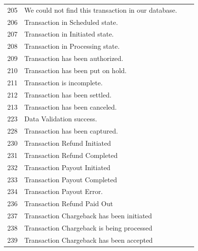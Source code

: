 \documentclass{article}
\newcommand{\cmark}{\ding{51}}
\newcommand{\xmark}{\ding{55}}
\begin{document}
\begin{longtable}{||c|p{7.5cm}||c||c||}
205 &We could not find this transaction in our database.& \textcolor{red} {\xmark} & \textcolor{red} {\xmark}  \\
206 &Transaction in Scheduled state.& \textcolor{red} {\xmark} & \textcolor{red} {\xmark}  \\
207 &Transaction in Initiated state.& \textcolor{red} {\xmark} & \textcolor{red} {\xmark}  \\
208 &Transaction in Processing state.& \textcolor{red} {\xmark} & \textcolor{red} {\xmark}  \\
209 &Transaction has been authorized.& \textcolor{red} {\xmark} & \textcolor{red} {\xmark}  \\
210 &Transaction has been put on hold.& \textcolor{red} {\xmark} & \textcolor{red} {\xmark}  \\
211 &Transaction is incomplete.& \textcolor{red} {\xmark} & \textcolor{red} {\xmark}  \\
212 &Transaction has been settled.& \textcolor{green} {\cmark} & \textcolor{red} {\xmark}  \\
213 &Transaction has been canceled.& \textcolor{red} {\xmark} & \textcolor{red} {\xmark}  \\
223 &Data Validation success.& \textcolor{red} {\xmark} & \textcolor{red} {\xmark}  \\
228 &Transaction has been captured.& \textcolor{green} {\cmark} & \textcolor{green} {\cmark}  \\
230 &Transaction Refund Initiated& \textcolor{green} {\cmark} & \textcolor{red} {\xmark}  \\
231 &Transaction Refund Completed& \textcolor{green} {\cmark} & \textcolor{red} {\xmark}  \\
232 &Transaction Payout Initiated& \textcolor{green} {\cmark} & \textcolor{green} {\cmark}  \\
233 &Transaction Payout Completed& \textcolor{green} {\cmark} & \textcolor{green} {\cmark}  \\
234 &Transaction Payout Error.& \textcolor{red} {\xmark} & \textcolor{red} {\xmark}  \\
236 &Transaction Refund Paid Out& \textcolor{green} {\cmark} & \textcolor{red} {\xmark}  \\
237 &Transaction Chargeback has been initiated& \textcolor{green} {\cmark} & \textcolor{red} {\xmark}  \\
238 &Transaction Chargeback is being processed& \textcolor{green} {\cmark} & \textcolor{red} {\xmark}  \\
239 &Transaction Chargeback has been accepted& \textcolor{green} {\cmark} & \textcolor{red} {\xmark}  \\

\end{longtable}
\end{document}
